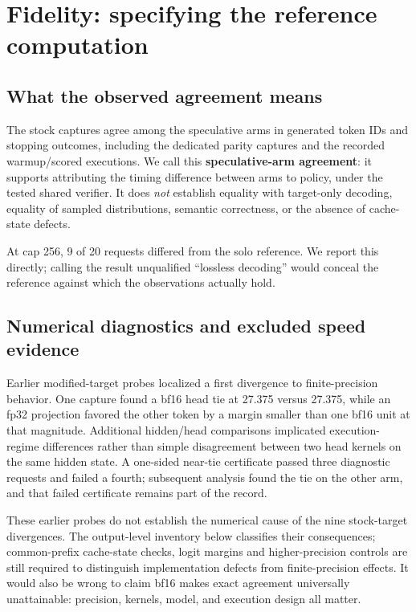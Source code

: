\documentclass[
  11pt,
]{article}
\begin{document}
\section{Fidelity: specifying the reference
computation}\label{fidelity-specifying-the-reference-computation}

\subsection{What the observed agreement
means}\label{what-the-observed-agreement-means}

The stock captures agree among the speculative arms in generated token
IDs and stopping outcomes, including the dedicated parity captures and
the recorded warmup/scored executions. We call this
\textbf{speculative-arm agreement}: it supports attributing the timing
difference between arms to policy, under the tested shared verifier. It
does \emph{not} establish equality with target-only decoding, equality
of sampled distributions, semantic correctness, or the absence of
cache-state defects.

At cap 256, 9 of 20 requests differed from the solo reference. We report
this directly; calling the result unqualified ``lossless decoding''
would conceal the reference against which the observations actually
hold.

\subsection{Numerical diagnostics and excluded speed
evidence}\label{numerical-diagnostics-and-excluded-speed-evidence}

Earlier modified-target probes localized a first divergence to
finite-precision behavior. One capture found a bf16 head tie at 27.375
versus 27.375, while an fp32 projection favored the other token by a
margin smaller than one bf16 unit at that magnitude. Additional
hidden/head comparisons implicated execution-regime differences rather
than simple disagreement between two head kernels on the same hidden
state. A one-sided near-tie certificate passed three diagnostic requests
and failed a fourth; subsequent analysis found the tie on the other arm,
and that failed certificate remains part of the record.

These earlier probes do not establish the numerical cause of the nine
stock-target divergences. The output-level inventory below classifies
their consequences; common-prefix cache-state checks, logit margins and
higher-precision controls are still required to distinguish
implementation defects from finite-precision effects. It would also be
wrong to claim bf16 makes exact agreement universally unattainable:
precision, kernels, model, and execution design all matter.
\end{document}
